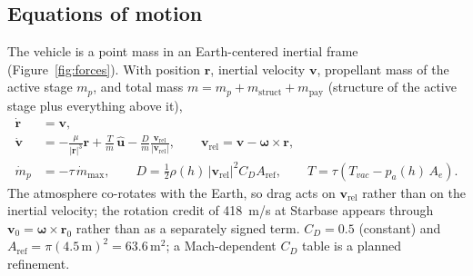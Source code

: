 \documentclass[11pt,a4paper]{article}
\newcommand{\unit}[1]{\,\mathrm{#1}}
\begin{document}
\subsection{Equations of motion}
The vehicle is a point mass in an Earth-centered inertial frame (Figure~\ref{fig:forces}). With position $\bm r$,
inertial velocity $\bm v$, propellant mass of the active stage $m_p$, and total mass
$m = m_p + m_{\mathrm{struct}} + m_{\mathrm{pay}}$ (structure of the active stage plus everything above it),
\begin{align}
\dot{\bm r} &= \bm v, \\
\dot{\bm v} &= -\frac{\mu}{|\bm r|^3}\bm r + \frac{T}{m}\,\hat{\bm u} - \frac{D}{m}\frac{\bm v_{\mathrm{rel}}}{|\bm v_{\mathrm{rel}}|},
\qquad \bm v_{\mathrm{rel}} = \bm v - \bm\omega\times\bm r, \\
\dot m_p &= -\tau\,\dot m_{\max}, \qquad D = \tfrac12\rho(h)\,|\bm v_{\mathrm{rel}}|^2 C_D A_{\mathrm{ref}},
\qquad T = \tau\left(T_{vac} - p_a(h)\,A_e\right).
\end{align}
The atmosphere co-rotates with the Earth, so drag acts on $\bm v_{\mathrm{rel}}$ rather than on the inertial velocity;
the rotation credit of 418~m/s at Starbase appears through $\bm v_0=\bm\omega\times\bm r_0$ rather than as a separately
signed term. $C_D = 0.5$ (constant) and $A_{\mathrm{ref}} = \pi(4.5\unit{m})^2 = 63.6\unit{m^2}$; a Mach-dependent
$C_D$ table is a planned refinement.
\end{document}
